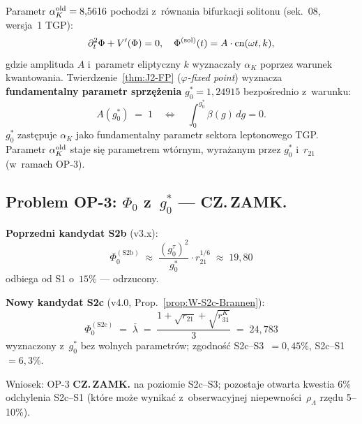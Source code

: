 \begin{remark}%
\label{rem:W-S2-superseded}
Parametr $\alpha_K^{\rm old} = 8{,}5616$ pochodzi z~r\'ownania
bifurkacji solitonu (sek.~08, wersja~1 TGP):
\begin{equation}
  \partial_t^2 \Phi + V'(\Phi) = 0,
  \quad
  \Phi^{(\rm sol)}(t) = A \cdot \mathrm{cn}(\omega t, k),
\end{equation}
gdzie amplituda $A$ i~parametr eliptyczny $k$ wyznacza\l{}y
$\alpha_K$ poprzez warunek kwantowania.
Twierdzenie~\ref{thm:J2-FP} (\textit{$\varphi$-fixed point})
wyznacza \textbf{fundamentalny parametr sprz\k{e}\.zenia}
$g_0^* = 1{,}24915$ bezpo\'{s}rednio z~warunku:
\begin{equation}
  A(g_0^*) \;=\; 1
  \quad\Longleftrightarrow\quad
  \int_0^{g_0^*} \beta(g)\,dg = 0.
\end{equation}
$g_0^*$ zast\k{e}puje $\alpha_K$ jako fundamentalny parametr
sektora leptonowego TGP.
Parametr $\alpha_K^{\rm old}$ staje si\k{e} parametrem
wt\'ornym, wyra\.zanym przez $g_0^*$ i~$r_{21}$
(w~ramach OP-3).
\end{remark}

\subsection{Problem OP-3: $\Phi_0$ z~$g_0^*$ — CZ.\,ZAMK.}%
\label{app:W-OP3}

\begin{remark}%
\label{rem:W-OP3-update}
\textbf{Poprzedni kandydat S2b} (v3.x):
\begin{equation}
  \Phi_0^{(\mathrm{S2b})}
  \;\approx\;
  \frac{(g_0^{\tau})^2}{g_0^*} \cdot r_{21}^{1/6}
  \;\approx\; 19{,}80
\end{equation}
odbiega od S1 o~$15\%$ — odrzucony.

\textbf{Nowy kandydat S2c} (v4.0, Prop.~\ref{prop:W-S2c-Brannen}):
\begin{equation}
  \Phi_0^{(\mathrm{S2c})}
  \;=\; \bar\lambda
  \;=\; \frac{1 + \sqrt{r_{21}} + \sqrt{r_{31}^K}}{3}
  \;=\; 24{,}783
\end{equation}
wyznaczony z~$g_0^*$ bez wolnych parametr\'ow;
zgodno\'{s}\'{c} S2c--S3~$= 0{,}45\%$, S2c--S1~$= 6{,}3\%$.

Wniosek: OP-3 \textbf{CZ.\,ZAMK.} na poziomie S2c--S3;
pozostaje otwarta kwestia 6\% odchylenia S2c--S1
(kt\'ore mo\.ze wynika\'{c} z~obserwacyjnej niepewno\'{s}ci~$\rho_\Lambda$
rz\k{e}du 5--10\%).
\end{remark}

